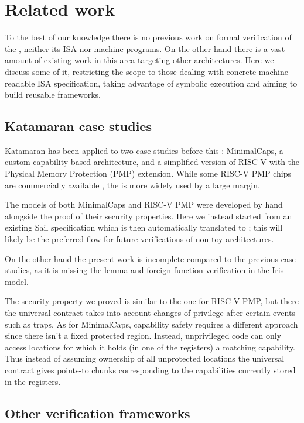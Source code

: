 \chapter{Related work}
\label{ch:related-work}

To the best of our knowledge there is no previous work on formal verification of the \msp, neither its ISA nor machine programs. On the other hand there is a vast amount of existing work in this area targeting other architectures. Here we discuss some of it, restricting the scope to those dealing with concrete machine-readable ISA specification, taking advantage of symbolic execution and aiming to build reusable frameworks.

\section{Katamaran case studies}

Katamaran has been applied to two case studies before this \cite{Huyghebaert2023}: MinimalCaps, a custom capability-based architecture, and a simplified version of RISC-V with the Physical Memory Protection (PMP) extension. While some RISC-V PMP chips are commercially available \cite{XuanTie}, the \msp is more widely used by a large margin.

The \usail models of both MinimalCaps and RISC-V PMP were developed by hand alongside the proof of their security properties. Here we instead started from an existing Sail specification which is then automatically translated to \usail; this will likely be the preferred flow for future verifications of non-toy architectures.

On the other hand the present work is incomplete compared to the previous case studies, as it is missing the lemma and foreign function verification in the Iris model.

The security property we proved is similar to the one for RISC-V PMP, but there the universal contract takes into account changes of privilege after certain events such as traps. As for MinimalCaps, capability safety requires a different approach since there isn't a fixed protected region. Instead, unprivileged code can only access locations for which it holds (in one of the registers) a matching capability. Thus instead of assuming ownership of all unprotected locations the universal contract gives points-to chunks corresponding to the capabilities currently stored in the registers.

\section{Other verification frameworks}

